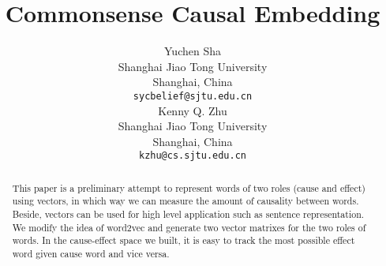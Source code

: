 \documentclass[11pt,a4paper]{article}
\title{Commonsense Causal Embedding}
\author{Yuchen Sha \\
  Shanghai Jiao Tong University \\
  Shanghai, China \\
  {\tt sycbelief@sjtu.edu.cn} \\\And
  Kenny Q. Zhu\\
  Shanghai Jiao Tong University \\
  Shanghai, China \\
  {\tt kzhu@cs.sjtu.edu.cn} \\}
\date{}
\begin{document}
\maketitle
\begin{abstract}
  This paper is a preliminary attempt to represent words of two roles (cause and effect) using vectors, in which way we can measure the amount of causality between words. Beside, vectors can be used for high level application such as sentence representation. We modify the idea of word2vec and generate two vector matrixes for the two roles of words. In the cause-effect space we built, it is easy to track the most possible effect word given cause word and vice versa. 
\end{abstract}

\begin{CJK}{UTF8}{gkai}
	
	
	
	
	
\end{CJK}



\end{document}
